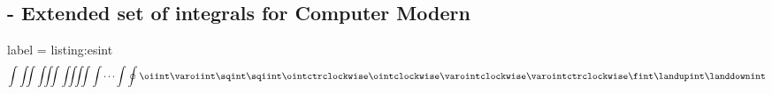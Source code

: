 
\subsection{ - Extended set of integrals for Computer Modern}

\begin{tcblisting}{label = listing:esint}
  \begin{equation*}
    \int \iint \iiint \iiiint \idotsint \oint \oiint \varoiint \sqint \sqiint \ointctrclockwise \ointclockwise \varointclockwise \varointctrclockwise \fint \landupint \landdownint
  \end{equation*}
\end{tcblisting}
